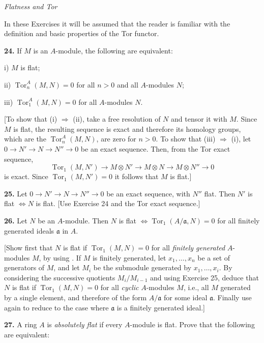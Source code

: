 \medskip
\noindent\emph{Flatness and Tor}

In these Exercises it will be assumed that the reader is familiar with the definition
and basic properties of the Tor functor.

\medskip
\noindent\amstar\textbf{24.} If $M$ is an $A$-module, the following are equivalent:

i) $M$ is flat;

ii) $\operatorname{Tor}_n^A(M,N)=0$ for all $n>0$ and all $A$-modules $N$;

iii) $\operatorname{Tor}_1^A(M,N)=0$ for all $A$-modules $N$.

[To show that (i) $\Rightarrow$ (ii), take a free resolution of $N$ and tensor it with $M$.  Since
$M$ is flat, the resulting sequence is exact and therefore its homology groups,
which are the $\operatorname{Tor}_n^A(M,N)$, are zero for $n>0$.  To show that (iii) $\Rightarrow$ (i), let
$0\longrightarrow N'\longrightarrow N\longrightarrow N''\longrightarrow0$ be an exact sequence.  Then, from the Tor exact
sequence,
\[
\operatorname{Tor}_1(M,N')\longrightarrow M\otimes N'\longrightarrow M\otimes N\longrightarrow M\otimes N''\longrightarrow0
\]
is exact.  Since $\operatorname{Tor}_1(M,N')=0$ it follows that $M$ is flat.]

\medskip
\noindent\amstar\textbf{25.} Let $0\longrightarrow N'\longrightarrow N\longrightarrow N''\longrightarrow0$ be an exact sequence, with $N''$ flat.  Then $N'$ is
flat $\Longleftrightarrow N$ is flat.  [Use Exercise 24 and the Tor exact sequence.]

\medskip
\noindent\amstar\textbf{26.} Let $N$ be an $A$-module.  Then $N$ is flat $\Longleftrightarrow\operatorname{Tor}_1(A/\mathfrak a,N)=0$ for all finitely
generated ideals $\mathfrak a$ in $A$.

[Show first that $N$ is flat if $\operatorname{Tor}_1(M,N)=0$ for all \emph{finitely generated} $A$-modules
$M$, by using .  If $M$ is finitely generated, let $x_1,\ldots,x_n$ be a set of generators
of $M$, and let $M_i$ be the submodule generated by $x_1,\ldots,x_i$.  By considering
the successive quotients $M_i/M_{i-1}$ and using Exercise 25, deduce that $N$ is flat
if $\operatorname{Tor}_1(M,N)=0$ for all \emph{cyclic} $A$-modules $M$, i.e., all $M$ generated by a single
element, and therefore of the form $A/\mathfrak a$ for some ideal $\mathfrak a$.  Finally use  again
to reduce to the case where $\mathfrak a$ is a finitely generated ideal.]

\medskip
\noindent\textbf{27.} A ring $A$ is \emph{absolutely flat} if every $A$-module is flat.  Prove that the following are
equivalent:

